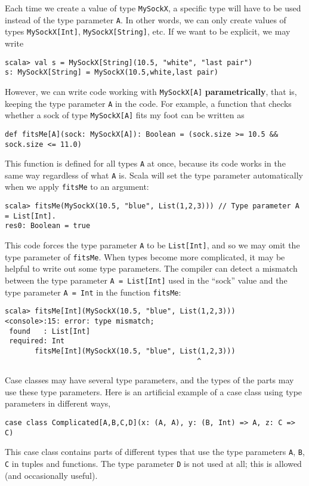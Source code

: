 Each time we create a value of type \lstinline!MySockX!, a specific
type will have to be used instead of the type parameter \lstinline!A!.
In other words, we can only create values of types \lstinline!MySockX[Int]!,
\lstinline!MySockX[String]!, etc. If we want to be explicit, we may
write
\begin{lstlisting}
scala> val s = MySockX[String](10.5, "white", "last pair")
s: MySockX[String] = MySockX(10.5,white,last pair) 
\end{lstlisting}
However, we can write code working with \lstinline!MySockX[A]! \textbf{parametrically},
that is, keeping the type parameter \lstinline!A! in the code. For
example, a function that checks whether a sock of type \lstinline!MySockX[A]!
fits my foot can be written as
\begin{lstlisting}
def fitsMe[A](sock: MySockX[A]): Boolean = (sock.size >= 10.5 && sock.size <= 11.0)
\end{lstlisting}
This function is defined for all types \lstinline!A! at once, because
its code works in the same way regardless of what \lstinline!A! is.
Scala will set the type parameter automatically when we apply \lstinline!fitsMe!
to an argument:
\begin{lstlisting}
scala> fitsMe(MySockX(10.5, "blue", List(1,2,3))) // Type parameter A = List[Int].
res0: Boolean = true
\end{lstlisting}
This code forces the type parameter \lstinline!A! to be \lstinline!List[Int]!,
and so we may omit the type parameter of \lstinline!fitsMe!. When
types become more complicated, it may be helpful to write out some
type parameters. The compiler can detect a mismatch between the type
parameter \lstinline!A = List[Int]! used in the \textsf{``}sock\textsf{''} value
and the type parameter \lstinline!A = Int! in the function \lstinline!fitsMe!:
\begin{lstlisting}
scala> fitsMe[Int](MySockX(10.5, "blue", List(1,2,3)))
<console>:15: error: type mismatch;
 found   : List[Int]
 required: Int
       fitsMe[Int](MySockX(10.5, "blue", List(1,2,3)))
                                             ^ 
\end{lstlisting}

Case classes may have several type parameters, and the types of the
parts may use these type parameters. Here is an artificial example
of a case class using type parameters in different ways,
\begin{lstlisting}
case class Complicated[A,B,C,D](x: (A, A), y: (B, Int) => A, z: C => C)
\end{lstlisting}
This case class contains parts of different types that use the type
parameters \lstinline!A!, \lstinline!B!, \lstinline!C! in tuples
and functions. The type parameter \lstinline!D! is not used at all;
this is allowed (and occasionally useful).

